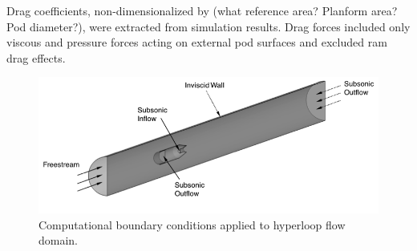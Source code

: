 	Drag coefficients, non-dimensionalized by (what reference area? Planform area? Pod diameter?),
	were extracted from simulation results.
	Drag forces included only viscous and pressure forces acting on external
	pod surfaces and excluded ram drag effects.


	\begin{figure}
		\centering
		\includegraphics[width=.75\textwidth]{../../images/CFDmodel.png}
		\caption{Computational boundary conditions applied to hyperloop flow domain.}
		\label{fig:CFDmodel}
	\end{figure}


